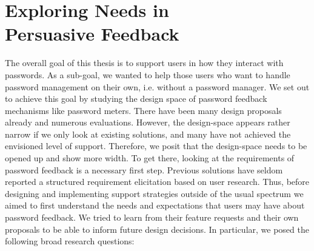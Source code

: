 \chapter[Exploring Needs in Persuasive Feedback] {Exploring Needs in\\ Persuasive Feedback}\label{chap:feedback_modalities}




The overall goal of this thesis is to support users in how they interact with passwords. As a sub-goal, we wanted to help those users who want to handle password management on their own, i.e. without a password manager. We set out to achieve this goal by studying the design space of password feedback mechanisms like password meters. There have been many design proposals already and numerous evaluations. However, the design-space appears rather narrow if we only look at existing solutions, and many have not achieved the envisioned level of support. Therefore, we posit that the design-space needs to be opened up and show more width. To get there, looking at the requirements of password feedback is a necessary first step. Previous solutions have seldom reported a structured requirement elicitation based on user research. Thus, before designing and implementing support strategies outside of the usual spectrum we aimed to first understand the needs and expectations that users may have about password feedback. We tried to learn from their feature requests and their own proposals to be able to inform future design decisions. In particular, we posed the following broad research questions:

